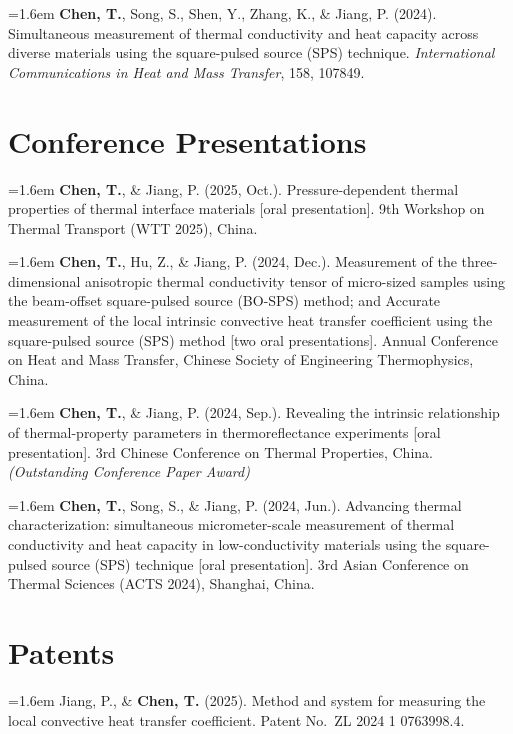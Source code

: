 \documentclass[10pt,a4paper]{article}
\newcommand{\pubitem}[1]{\par\noindent\hangindent=1.6em\hangafter=1 #1\par\addvspace{3pt}}
\begin{document}
\pubitem{\textbf{Chen, T.}, Song, S., Shen, Y., Zhang, K., \& Jiang, P. (2024). Simultaneous measurement of thermal conductivity and heat capacity across diverse materials using the square-pulsed source (SPS) technique. \textit{International Communications in Heat and Mass Transfer}, 158, 107849.}

\section{Conference Presentations}

\pubitem{\textbf{Chen, T.}, \& Jiang, P. (2025, Oct.). Pressure-dependent thermal properties of thermal interface materials [oral presentation]. 9th Workshop on Thermal Transport (WTT 2025), China.}

\pubitem{\textbf{Chen, T.}, Hu, Z., \& Jiang, P. (2024, Dec.). Measurement of the three-dimensional anisotropic thermal conductivity tensor of micro-sized samples using the beam-offset square-pulsed source (BO-SPS) method; and Accurate measurement of the local intrinsic convective heat transfer coefficient using the square-pulsed source (SPS) method [two oral presentations]. Annual Conference on Heat and Mass Transfer, Chinese Society of Engineering Thermophysics, China.}

\pubitem{\textbf{Chen, T.}, \& Jiang, P. (2024, Sep.). Revealing the intrinsic relationship of thermal-property parameters in thermoreflectance experiments [oral presentation]. 3rd Chinese Conference on Thermal Properties, China. \textit{(Outstanding Conference Paper Award)}}

\pubitem{\textbf{Chen, T.}, Song, S., \& Jiang, P. (2024, Jun.). Advancing thermal characterization: simultaneous micrometer-scale measurement of thermal conductivity and heat capacity in low-conductivity materials using the square-pulsed source (SPS) technique [oral presentation]. 3rd Asian Conference on Thermal Sciences (ACTS 2024), Shanghai, China.}

\section{Patents}

\pubitem{Jiang, P., \& \textbf{Chen, T.} (2025). Method and system for measuring the local convective heat transfer coefficient. Patent No.\ ZL 2024 1 0763998.4.}
\end{document}
